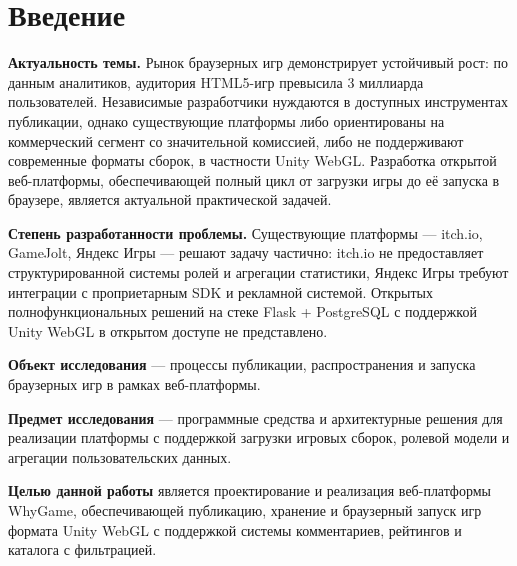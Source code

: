 \section*{Введение}

\textbf{Актуальность темы.} Рынок браузерных игр демонстрирует устойчивый рост:
по данным аналитиков, аудитория HTML5-игр превысила 3 миллиарда пользователей.
Независимые разработчики нуждаются в доступных инструментах публикации, однако
существующие платформы либо ориентированы на коммерческий сегмент со значительной
комиссией, либо не поддерживают современные форматы сборок, в частности Unity WebGL.
Разработка открытой веб-платформы, обеспечивающей полный цикл от загрузки игры
до её запуска в браузере, является актуальной практической задачей.

\textbf{Степень разработанности проблемы.} Существующие платформы --- itch.io,
GameJolt, Яндекс Игры --- решают задачу частично: itch.io не предоставляет
структурированной системы ролей и агрегации статистики, Яндекс Игры требуют
интеграции с проприетарным SDK и рекламной системой. Открытых полнофункциональных
решений на стеке Flask + PostgreSQL с поддержкой Unity WebGL в открытом доступе
не представлено.

\textbf{Объект исследования} --- процессы публикации, распространения и запуска
браузерных игр в рамках веб-платформы.

\textbf{Предмет исследования} --- программные средства и архитектурные решения
для реализации платформы с поддержкой загрузки игровых сборок, ролевой модели
и агрегации пользовательских данных.

\textbf{Целью данной работы} является проектирование и реализация веб-платформы
WhyGame, обеспечивающей публикацию, хранение и браузерный запуск игр формата
Unity WebGL с поддержкой системы комментариев, рейтингов и каталога с фильтрацией.